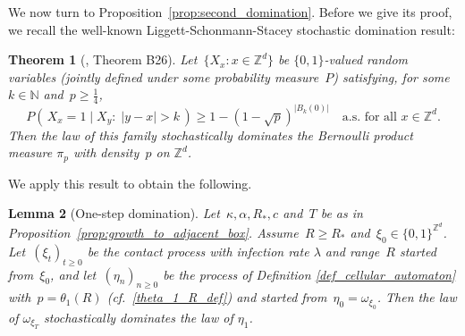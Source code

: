 \documentclass[a4paper,12pt]{article}
\newtheorem  {theorem}       {Theorem}[section]
\newtheorem  {lemma}         [theorem]{Lemma}
\newcommand{\Z}{\mathbb{Z}}
\begin{document}
\smallskip

We now turn to Proposition~\ref{prop:second_domination}. Before we give its proof, we recall the well-known Liggett-Schonmann-Stacey \cite{LSS97} stochastic domination result:
\begin{theorem}[\cite{Li99}, Theorem B26]\label{thm:lss}
Let~$\{X_x:x\in\mathbb{Z}^d\}$ be $\{0,1\}$-valued random variables (jointly defined under some probability measure~$P$) satisfying, for some~$k \in \mathbb{N}$ and~$p \geq \tfrac14$,
$$P( \, X_x = 1 \mid X_y:\;|y-x| > k \, ) \geq 1-(1-\sqrt{p})^{|B_k(0)|} \quad \text{a.s. for all }x \in \Z^d.$$
Then the law of this family stochastically dominates the Bernoulli product measure $\pi_p$ with density~$p$ on $\mathbb{Z}^d$.
\end{theorem}
We apply this result to obtain the following.
\begin{lemma}[One-step domination] \label{lem:domination_time_one}
Let~$\kappa, \alpha,  R_{*},  c$ and~$T$ be as in Proposition~\ref{prop:growth_to_adjacent_box}. Assume~$R \ge R_*$ and~$\xi_0 \in \{0,1\}^{\Z^d}$. Let~$(\xi_t)_{t \geq 0}$ be the contact process with infection rate $\lambda$ and range~$R$ started from~$\xi_0$, and let~$(\eta_n)_{n \ge 0}$ be the process of Definition \ref{def_cellular_automaton} with~$p = \theta_1(R)$ (cf.\ \eqref{theta_1_R_def}) and started from~$\eta_0 = \omega_{\xi_0}$. Then the law of $\omega_{\xi_T}$ stochastically dominates the law of $\eta_1$.
\end{lemma}
\end{document}
